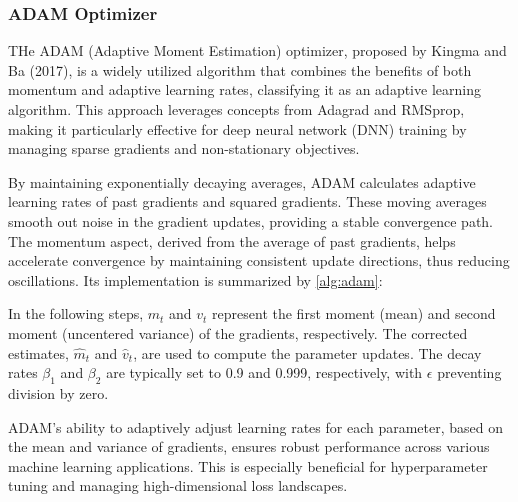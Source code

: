 \subsubsection{ADAM Optimizer}\label{sec:adam}
THe ADAM (Adaptive Moment Estimation) optimizer, proposed by Kingma and Ba (2017)\cite{kingmaAdamMethodStochastic2017}, is a widely utilized algorithm that combines
the benefits of both momentum and
adaptive learning rates, classifying it as an adaptive learning algorithm. This approach leverages concepts from Adagrad\cite{duchiAdaptiveSubgradientMethods}
and RMSprop\cite{LectureRmspropDivide}, making it particularly effective for deep neural network (DNN) training by managing
sparse gradients and non-stationary objectives.

By maintaining exponentially decaying averages, ADAM calculates adaptive learning rates of past gradients and squared gradients.
These moving averages smooth out noise in the gradient updates, providing a stable convergence path.
The momentum aspect, derived from the average of past gradients, helps accelerate convergence by maintaining
consistent update directions, thus reducing oscillations. Its implementation is summarized by \cref{alg:adam}:

In the following steps, $m_t$ and $v_t$ represent the first moment (mean) and second moment (uncentered variance) of the gradients,
respectively. The corrected estimates, $\hat{m}_t$ and $\hat{v}_t$, are used to compute the parameter updates. The decay rates $\beta_1$
and $\beta_2$ are typically set to 0.9 and 0.999, respectively, with $\epsilon$ preventing division by zero.

ADAM's ability to adaptively adjust learning rates for each parameter, based on the mean and variance of gradients, ensures robust performance
across various machine learning applications. This is especially beneficial for hyperparameter tuning and managing high-dimensional loss landscapes.

